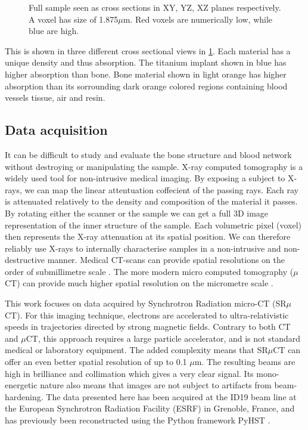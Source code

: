 \begin{figure}
\caption{Full sample seen as cross sections in XY, YZ, XZ planes respectively. A voxel has size of
1.875$\mu$m. Red voxels are numerically low, while blue are high.}
\label{fig:3viewsample}
\end{figure}

This is shown in three different cross sectional views
in \cref{fig:3viewsample}. Each material has a unique density and thus absorption. The titanium
implant shown in blue has higher absorption than bone. Bone material shown in light orange has
higher absorption than its sorrounding dark orange colored regions containing blood vessels
tissue, air and resin.

\subsection{Data acquisition}

It can be difficult to study and evaluate the bone structure and blood network without destroying
or manipulating the sample. X-ray computed tomography is a widely used tool for non-intrusive medical
imaging. By exposing a subject to X-rays, we can map the linear attentuation coffecient of the passing
rays. Each ray is attenuated relatively to the density and composition of the material it passes.
By rotating either the scanner or the sample we can get a full 3D image representation of the inner
structure of the sample. Each volumetric pixel (voxel) then represents the X-ray attenuation at its
spatial position. We can therefore reliably use X-rays to internally characterise samples in a
non-intrusive and non-destructive manner. Medical CT-scans can provide spatial resolutions on the
order of submillimetre scale \citep{medicalct}. The more modern micro computed tomography ($\mu$CT)
can provide much higher spatial resolution on the micrometre scale \citep{srexptime}.

This work focuses on data acquired by Synchrotron Radiation micro-CT (SR$\mu$CT). For this imaging
technique, electrons are accelerated to ultra-relativistic speeds in trajectories directed by strong
magnetic fields. Contrary to both CT and $\mu$CT, this approach requires a large particle accelerator,
and is not standard medical or laboratory equipment. The added complexity means that SR$\mu$CT can
offer an even better spatial resolution of up to 0.1 $\mu$m. The resulting beams are high in
brilliance and collimation which gives a very clear signal. Its mono-energetic nature also means
that images are not subject to artifacts from beam-hardening.
The data presented here has been
acquired at the ID19 beam line at the European Synchrotron Radiation Facility (ESRF) in Grenoble,
France, and has previously  been reconstructed using the Python
framework PyHST \citep{pyhst}.

